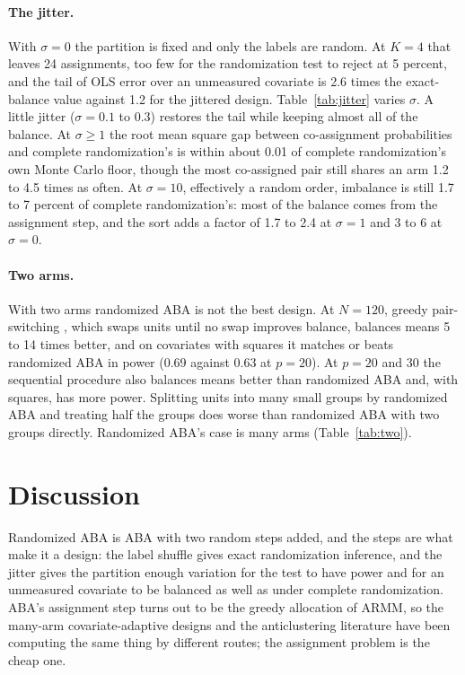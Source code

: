\documentclass[11pt]{article}
\theoremstyle{remark}
\begin{document}
\paragraph{The jitter.} With $\sigma = 0$ the partition is fixed and only
the labels are random. At $K = 4$ that leaves 24 assignments, too few for
the randomization test to reject at 5 percent, and the tail of OLS error over
an unmeasured covariate is 2.6 times the exact-balance value against 1.2 for
the jittered design. Table~\ref{tab:jitter} varies $\sigma$. A little jitter
($\sigma = 0.1$ to $0.3$) restores the tail while keeping almost all of the
balance. At $\sigma \ge 1$ the root mean square gap between co-assignment
probabilities and complete randomization's is within about 0.01 of complete
randomization's own Monte Carlo floor, though the most co-assigned pair still
shares an arm 1.2 to 4.5 times as often. At $\sigma = 10$, effectively a
random order, imbalance is still 1.7 to 7 percent of complete
randomization's: most of the balance comes from the assignment step, and the
sort adds a factor of 1.7 to 2.4 at $\sigma = 1$ and 3 to 6 at $\sigma = 0$.



\paragraph{Two arms.} With two arms randomized ABA is not the best design.
At $N = 120$, greedy pair-switching \citep{krieger2019}, which swaps units
until no swap improves balance, balances means 5 to 14 times better, and on
covariates with squares it matches or beats randomized ABA in power (0.69
against 0.63 at $p = 20$). At $p = 20$ and $30$ the sequential procedure
also balances means better than randomized ABA and, with squares, has more
power. Splitting units into many small groups by
randomized ABA and treating half the groups does worse than randomized ABA
with two groups directly. Randomized ABA's case is many arms (Table~\ref{tab:two}).



\section{Discussion}

Randomized ABA is ABA with two random steps added, and the steps are what make
it a design: the label shuffle gives exact randomization inference, and the
jitter gives the partition enough variation for the test to have power and
for an unmeasured covariate to be balanced as well as under complete
randomization. ABA's assignment step turns out to be the greedy allocation of
ARMM, so the many-arm covariate-adaptive designs and the anticlustering
literature have been computing the same thing by different routes; the
assignment problem is the cheap one.
\end{document}
